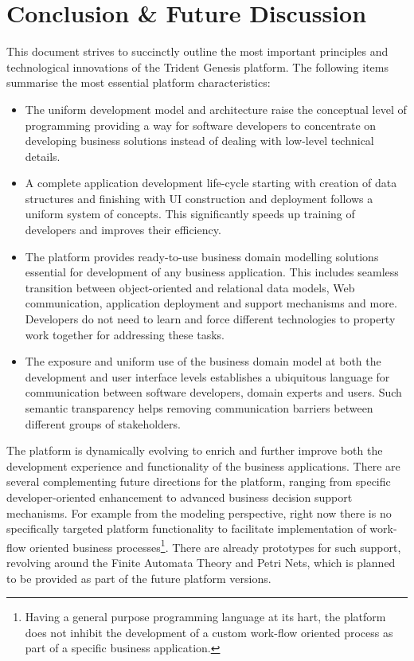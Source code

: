 \section{Conclusion \& Future Discussion}\label{sec:08}

  This document strives to succinctly outline the most important principles and technological innovations of the Trident Genesis platform.
  The following items summarise the most essential platform characteristics: 
  \begin{itemize}
    \item The uniform development model and architecture raise the conceptual level of programming providing a way for software developers to concentrate on developing business solutions instead of dealing with low-level technical details.
    \item A complete application development life-cycle starting with creation of data structures and finishing with UI construction and deployment follows a uniform system of concepts.
	This significantly speeds up training of developers and improves their efficiency.
    \item The platform provides ready-to-use business domain modelling solutions essential for development of any business application.
	  This includes seamless transition between object-oriented and relational data models, Web communication, application deployment and support mechanisms and more.
	  Developers do not need to learn and force different technologies to property work together for addressing these tasks.
    \item The exposure and uniform use of the business domain model at both the development and user interface levels establishes a ubiquitous language for communication between software developers, domain experts and users.
	  Such semantic transparency helps removing communication barriers between different groups of stakeholders.
  \end{itemize}

  The platform is dynamically evolving to enrich and further improve both the development experience and functionality of the business applications.
  There are several complementing future directions for the platform, ranging from specific developer-oriented enhancement to advanced business decision support mechanisms.
  For example from the modeling perspective, right now there is no specifically targeted platform functionality to facilitate implementation of work-flow oriented business processes\footnote{Having a general purpose programming language at its hart, the platform does not inhibit the development of a custom work-flow oriented process as part of a specific business application.}.
  There are already prototypes for such support, revolving around the Finite Automata Theory and Petri Nets, which is planned to be provided as part of the future platform versions.
  
